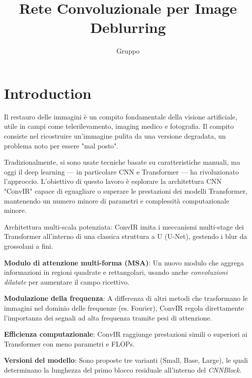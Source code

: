 \documentclass[a4paper,10pt,twocolumn]{article}
\title{\textbf{Rete Convoluzionale per Image Deblurring}}
\author{Gruppo}
\begin{document}

\section{Introduction}

Il restauro delle immagini è un compito fondamentale della visione artificiale, utile in campi come telerilevamento,
imaging medico e fotografia. Il compito consiste nel ricostruire un'immagine pulita da una versione degradata,
un problema noto per essere "mal posto".

Tradizionalmente, si sono usate tecniche basate su caratteristiche manuali, ma oggi il deep learning — in particolare CNN e Transformer —
ha rivoluzionato l'approccio.
L'obiettivo di questo lavoro è esplorare la architettura CNN "ConvIR"\cite{convir} capace di eguagliare o superare le prestazioni dei
modelli Transformer, mantenendo un numero minore di parametri e complessit\`a computazionale minore.

Architettura multi-scala potenziata: ConvIR imita i meccanismi multi-stage dei Transformer all'interno di una classica struttura a U (U-Net),
gestendo i blur da grossolani a fini.

\textbf{Modulo di attenzione multi-forma (MSA)}: Un nuovo modulo che aggrega informazioni in regioni quadrate e rettangolari,
usando anche \textit{convoluzioni dilatate} per aumentare il campo ricettivo.

\textbf{Modulazione della frequenza}: A differenza di altri metodi che trasformano le immagini nel dominio delle frequenze (es. Fourier),
ConvIR regola direttamente l'importanza dei segnali ad alta frequenza tramite pesi di attenzione.

\textbf{Efficienza computazionale}: ConvIR raggiunge prestazioni simili o superiori ai Transformer con meno parametri e FLOPs.

\textbf{Versioni del modello}\cite{convir}: Sono proposte tre varianti (Small, Base, Large), le quali determinano la lunghezza del primo blocco residuale
all'interno del \textit{CNNBlock}.
\end{document}
